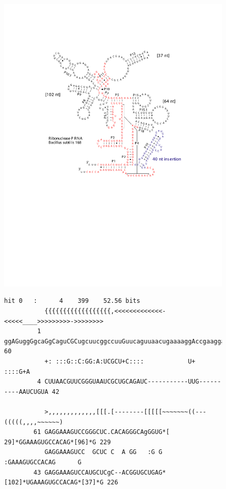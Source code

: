 \begin{figure}[tp]
\begin{center}
\includegraphics[scale=0.6]{Figures/rnaseP-bsu-alignment}
\end{center}
\begin{center}
{\scriptsize
\begin{BVerbatim}
hit 0   :      4    399    52.56 bits
           {{{{{{{{{{{{{{{{{{,<<<<<<<<<<<<<-<<<<<____>>>>>>>>>->>>>>>>>
         1 ggAGuggGgcaGgCaguCGCugcuucggccuuGuucaguuaacugaaaaggAccgaagga 60      
           +: :::G::C:GG:A:UCGCU+C::::            U+            ::::G+A
         4 CUUAACGUUCGGGUAAUCGCUGCAGAUC-----------UUG----------AAUCUGUA 42      

           >,,,,,,,,,,,,,[[[.[--------[[[[[~~~~~~~((---(((((,,,,~~~~~~)
        61 GAGGAAAGUCCGGGCUC.CACAGGGCAgGGUG*[ 29]*GGAAAGUGCCACAG*[96]*G 229     
           GAGGAAAGUCC  GCUC C  A GG   :G G       :GAAAGUGCCACAG      G
        43 GAGGAAAGUCCAUGCUCgC--ACGGUGCUGAG*[102]*UGAAAGUGCCACAG*[37]*G 226     


\end{BVerbatim}}
\end{center}
\end{figure}
